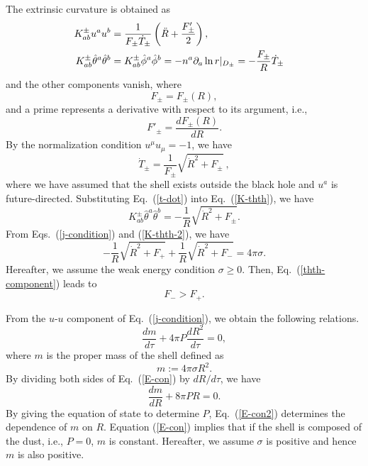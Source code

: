 \documentclass[aps,preprint,preprintnumber,nofootinbib,amsmath,amssymb,ascmac,bm,12pt]{revtex4}
\newcommand{\thetah}{\hat{\theta}}
\newcommand{\phih}{\hat{\phi}}
\begin{document}
The extrinsic curvature is obtained as
\begin{align}
K_{ab}^\pm u^a u^b&=\frac{1}{F_{\pm}\dot{T}_{\pm}}\left(\ddot{R}+\frac{F'_\pm}{2}\right), \cr
K^\pm_{ab}\thetah^a \thetah^b&=
K_{ab}^\pm\phih^a \phih^b=-n^a\partial_a \ln r|_{D_\pm}=-\frac{F_\pm}{R}\dot{T}_\pm  \label{K-thth}
\end{align}
and the other components vanish, where 
$$
F_\pm=F_\pm(R),
$$ 
and a prime represents a derivative with respect to its argument, i.e., 
$$
F'_\pm=\frac{dF_\pm(R)}{dR}.
$$
By the normalization condition $u^\mu u_\mu=-1$, we have
\begin{equation}
\dot{T}_{\pm}= \frac{1}{F_\pm}\sqrt{\dot{R}^2+F_\pm}~, \label{t-dot}
\end{equation}
where we have assumed that the shell exists outside the black hole and $u^a$ is future-directed. 
Substituting Eq.~(\ref{t-dot}) into Eq.~(\ref{K-thth}), we have
\begin{equation}
K_{ab}^\pm\thetah^a \thetah^b=- \frac{1}{R}\sqrt{\dot{R}^2+F_\pm}. \label{K-thth-2}
\end{equation}
From Eqs.~(\ref{j-condition}) and (\ref{K-thth-2}), we have
\begin{equation}
- \frac{1}{R}\sqrt{\dot{R}^2+F_+}+ \frac{1}{R}\sqrt{\dot{R}^2+F_-}=4\pi \sigma. 
\label{thth-component}
\end{equation}
Hereafter, we assume the weak energy condition $\sigma\geq0$. Then, Eq.~(\ref{thth-component}) 
leads to
\begin{equation}
F_->F_+. \label{M-increasing}
\end{equation}

From the $u$-$u$ component of Eq.~(\ref{j-condition}), we obtain the following relations.
\begin{equation}
\frac{d m}{d\tau}+4\pi P\frac{dR^2}{d\tau}=0, \label{E-con}
\end{equation}
where $m$ is the proper mass of the shell defined as
\begin{equation}
m:=4\pi \sigma R^2. \label{p-mass}
\end{equation}
By dividing both sides of Eq.~(\ref{E-con}) by $dR/d\tau$, we have
\begin{equation}
\frac{dm}{dR}+8\pi PR=0. \label{E-con2}
\end{equation}
By giving the equation of state to determine $P$, 
Eq.~(\ref{E-con2}) determines the dependence of $m$ 
on $R$. Equation (\ref{E-con}) implies that if the shell is composed of the dust, i.e., 
$P=0$, $m$ is constant. 
Hereafter, we assume $\sigma$ is positive and hence $m$ is also positive. 
\end{document}
